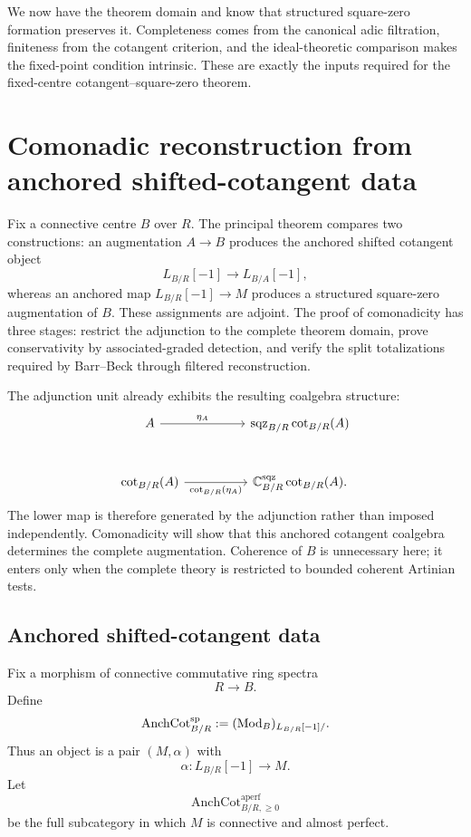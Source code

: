 We now have the theorem domain and know that structured square-zero formation preserves
it. Completeness comes from the canonical adic filtration, finiteness from the cotangent
criterion, and the ideal-theoretic comparison makes the fixed-point condition intrinsic.
These are exactly the inputs required for the fixed-centre cotangent--square-zero
theorem.

\section{Comonadic reconstruction from anchored shifted-cotangent data}
\label{sec:cotangent-square-zero-comonadic}


Fix a connective centre \(B\) over \(R\). The principal theorem compares two
constructions: an augmentation \(A\to B\) produces the anchored shifted cotangent object
\[
    L_{B/R}[-1]\longrightarrow L_{B/A}[-1],
\]
whereas an anchored map \(L_{B/R}[-1]\to M\) produces a structured square-zero
augmentation of \(B\). These assignments are adjoint. The proof of comonadicity has
three stages: restrict the adjunction to the complete theorem domain, prove
conservativity by associated-graded detection, and verify the split totalizations
required by Barr--Beck through filtered reconstruction.

The adjunction unit already exhibits the resulting coalgebra structure:
\[
\begin{tikzcd}[column sep=huge,row sep=large]
    A
        \arrow[r,"\eta_A"]
    &
    \operatorname{sqz}_{B/R}\operatorname{cot}_{B/R}(A)
    \\
    \operatorname{cot}_{B/R}(A)
        \arrow[r,"{\operatorname{cot}_{B/R}(\eta_A)}"']
    &
    \mathbb C^{\mathrm{sqz}}_{B/R}
        \operatorname{cot}_{B/R}(A).
\end{tikzcd}
\]
The lower map is therefore generated by the adjunction rather than imposed
independently. Comonadicity will show that this anchored cotangent coalgebra determines
the complete augmentation. Coherence of \(B\) is unnecessary here; it enters only when
the complete theory is restricted to bounded coherent Artinian tests.

\subsection{Anchored shifted-cotangent data}

\begin{definition}
\label{def:anchored-shifted-cotangent-category}
Fix a morphism of connective commutative ring spectra
\[
    R\longrightarrow B.
\]
Define
\[
    \operatorname{AnchCot}^{\mathrm{sp}}_{B/R}
    :=
    (\operatorname{Mod}_B)_{L_{B/R}[-1]/}.
\]
Thus an object is a pair \((M,\alpha)\) with
\[
    \alpha:L_{B/R}[-1]\longrightarrow M.
\]
Let
\[
    \operatorname{AnchCot}^{\mathrm{aperf}}_{B/R,\geq0}
\]
be the full subcategory in which \(M\) is connective and almost perfect.
\end{definition}

